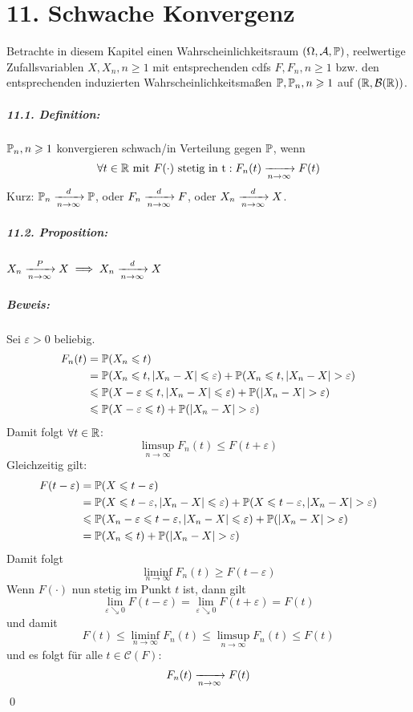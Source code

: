 \chapter*{11. Schwache Konvergenz}
 Betrachte in diesem Kapitel einen Wahrscheinlichkeitsraum $(\Omega, \mathcal{A}, \mathbb{P})$, reelwertige Zufallsvariablen $X, X_n, n\geq1$ mit entsprechenden cdfs $F,F_n,n\geq1$ bzw. den entsprechenden induzierten Wahrscheinlichkeitsma\ss{}en $\mathbb{P}, \mathbb{P}_n,n\geqslant 1$ auf $(\mathbb{R}, \mathcal{B}(\mathbb{R}))$.
	

\paragraph{11.1. Definition:} $\mathbb{P}_n,n\geqslant1$ konvergieren schwach/in Verteilung gegen $\mathbb{P}$, wenn 
    $$\forall t\in\R\text{ mit } F(\cdot) \text{ stetig in t}: F_n(t)\nto{}{n\to\infty}F(t)$$ 
Kurz: $\Pp_n\nto{d}{n\to\infty}\Pp$, oder $F_n\nto{d}{n\to\infty}F$, oder $X_n\nto{d}{n\to\infty}X$.

\paragraph{11.2. Proposition:} $X_n\nto{P}{n\to\infty} X\implies X_n\nto{d}{n\to\infty} X$

\paragraph{Beweis:} Sei $\varepsilon>0$ beliebig.
\begin{align*}
    F_n(t)&=\Pp(X_n\leq t)\\
	&=\Pp(X_n\leq t, |X_n-X|\leq\varepsilon) + \Pp(X_n\leq t,|X_n-X|>\varepsilon) \\
	&\leq\Pp(X-\varepsilon\leq t,|X_n-X|\leq\varepsilon)+\Pp(|X_n-X|>\varepsilon) \\
	&\leq \Pp(X-\varepsilon\leq t)+\Pp(|X_n-X|>\varepsilon)
\end{align*}
Damit folgt $\forall t\in\mathbb{R}$: 
    $$\limsup_{n\to\infty}F_n(t)\leq F(t+\varepsilon)$$
Gleichzeitig gilt:
\begin{align*}
    F(t-\varepsilon)&=\Pp(X\leq t-\varepsilon) \\
	&=\Pp(X\leq t-\varepsilon , |X_n-X|\leq\varepsilon)+\Pp(X\leq t-\varepsilon, |X_n-X|>\varepsilon) \\
	&\leq\Pp(X_n-\varepsilon\leq t-\varepsilon,|X_n-X|\leq\varepsilon)+\Pp(|X_n-X|>\varepsilon) \\
	&=\Pp(X_n\leq t)+\Pp(|X_n-X|>\varepsilon)
\end{align*}
Damit folgt 
    $$\liminf_{n\to\infty}F_n(t)\geq F(t-\varepsilon)$$
Wenn $F(\cdot)$ nun stetig im Punkt $t$ ist, dann gilt 
    $$\lim_{\varepsilon\searrow0}F(t-\varepsilon)=\lim_{\varepsilon\searrow0}F(t+\varepsilon)=F(t)$$
und damit 
	$$F(t)\leq\liminf_{n\to\infty}F_n(t)\leq\limsup_{n\to\infty}F_n(t)\leq F(t)$$	
und es folgt f\"ur alle $t\in\mathcal{C}(F)$:
	$$F_n(t)\nto{}{n\to\infty}F(t)$$
\qed


